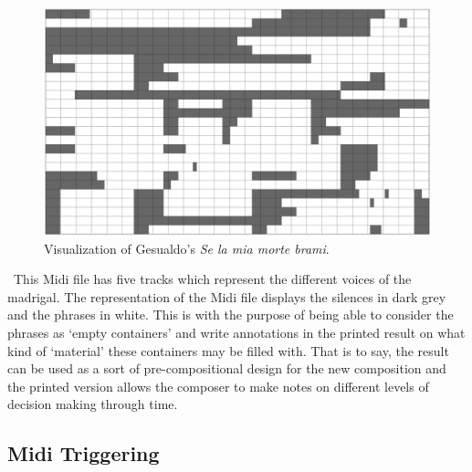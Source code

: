 \begin{figure}[htbp] %
   \centering
   \includegraphics[width=16cm]{Chapter6/midi_gesualdo.tif} %
   \caption{Visualization of Gesualdo's \emph{Se la mia morte brami}.}
   \label{fig:example}
\end{figure}\
This Midi file has five tracks which represent the different voices of the madrigal. The representation of the Midi file displays the silences in dark grey and the phrases in white. This is with the purpose of being able to consider the phrases as `empty containers' and write annotations in the printed result on what kind of `material' these containers may be filled with. That is to say, the result can be used as a sort of pre-compositional design for the new composition and the printed version allows the composer to make notes on different levels of decision making through time.


\subsection{Midi Triggering}

